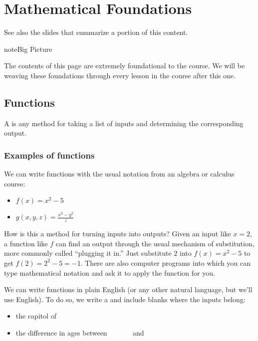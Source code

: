 \documentclass[letterpaper,10pt,english]{sphinxmanual}
\begin{document}
\chapter{Mathematical Foundations}
\label{\detokenize{chapter-2-mathematical-foundations:mathematical-foundations}}\label{\detokenize{chapter-2-mathematical-foundations::doc}}
See also the slides that summarize a portion of this content.

\begin{sphinxadmonition}{note}{Big Picture}

The contents of this page are extremely foundational to the course.  We will be weaving these foundations through every lesson in the course after this one.
\end{sphinxadmonition}


\section{Functions}
\label{\detokenize{chapter-2-mathematical-foundations:functions}}
 A  is any method for taking a list of inputs and determining the corresponding output.


\subsection{Examples of functions}
\label{\detokenize{chapter-2-mathematical-foundations:examples-of-functions}}
 We can write functions with the usual notation from an algebra or calculus course:
\begin{itemize}
\item {} 
\(f(x)=x^2-5\)

\item {} 
\(g(x,y,z)=\frac{x^2-y^2}{z}\)

\end{itemize}

How is this a method for turning inputs into outputs?  Given an input like \(x=2\), a function like \(f\) can find an output through the usual mechanism of substitution, more commonly called “plugging it in.”  Just substitute \(2\) into \(f(x)=x^2-5\) to get \(f(2)=2^2-5=-1\).  There are also computer programs into which you can type mathematical notation and ask it to apply the function for you.

 We can write functions in plain English (or any other natural language, but we’ll use English).  To do so, we write a  and include blanks where the inputs belong:
\begin{itemize}
\item {} 
the capitol of        

\item {} 
the difference in ages between         and        

\end{itemize}
\end{document}

